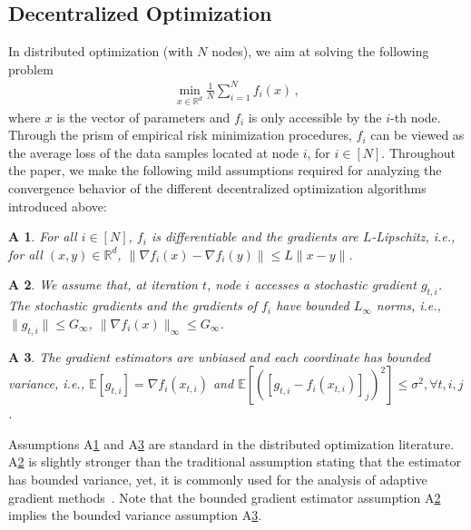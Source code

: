 \documentclass[11pt]{article}
\newtheorem{assumptionA}{A\!\!}
\begin{document}
\subsection{Decentralized Optimization }


In distributed optimization (with $N$ nodes), we aim at solving the following problem
\begin{align}\label{eq:minproblem}
\min_{x \in \mathbb{R}^d} \frac{1}{N}\sum_{i=1}^N f_i(x) \, ,
\end{align}
where $x$ is the vector of parameters and $f_i$ is only accessible by the $i$-th node. 
Through the prism of empirical risk minimization procedures, $f_i$ can be viewed as the average loss of the data samples located at node $i$, for $i \in [N]$. 
Throughout the paper, we make the following mild assumptions required for analyzing the convergence behavior of the different decentralized optimization algorithms introduced above:
\begin{assumptionA}\label{a:diff}
For all $i \in [N]$, $f_i$ is differentiable and the gradients are $L$-Lipschitz, i.e., for all $(x, y) \in \mathbb{R}^d$, $\|\nabla f_i(x) - \nabla f_i(y) \| \leq L\|x-y\|$.
\end{assumptionA}
\begin{assumptionA}\label{a:boundsto}
We assume that, at iteration $t$, node $i$ accesses a stochastic gradient $g_{t,i}$. The stochastic gradients and the gradients of $f_i$ have bounded $L_{\infty}$ norms, i.e., $\|g_{t,i}\| \leq G_{\infty}$, $\|\nabla f_i(x)\|_{\infty} \leq G_{\infty}$. 
\end{assumptionA}
\begin{assumptionA}\label{a:boundedvar}
The gradient estimators are unbiased and each coordinate has bounded variance, i.e., $\mathbb E [g_{t,i}] = \nabla f_i(x_{t,i}) $ and $\mathbb E [([g_{t,i} - f_i(x_{t,i})]_j)^2] \leq  \sigma^2, \forall t,i,j$ . 
\end{assumptionA}
Assumptions A\ref{a:diff} and A\ref{a:boundedvar} are standard in the distributed optimization literature. 
A\ref{a:boundsto} is slightly stronger than the traditional assumption stating that the estimator has bounded variance, yet, it is commonly used for the analysis of adaptive gradient methods~\citep{chen2018convergence,ward2019adagrad}. 
Note that the bounded gradient estimator assumption A\ref{a:boundsto} implies the bounded variance assumption A\ref{a:boundedvar}.
\end{document}
